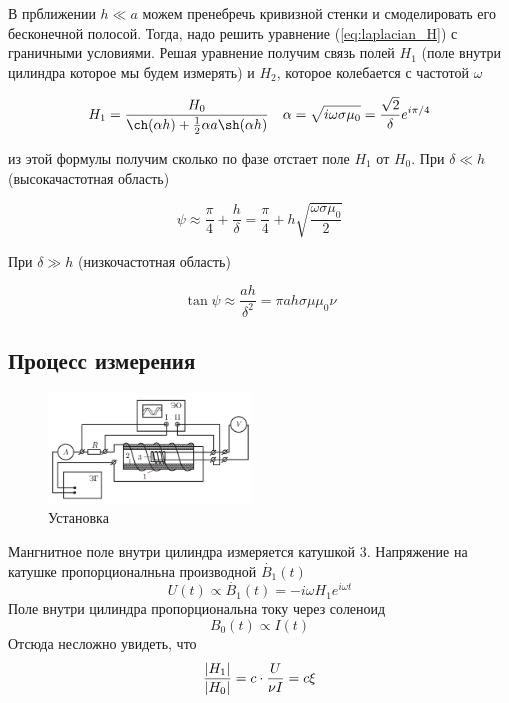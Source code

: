 \documentclass[a4paper]{article}
\begin{document}
В прближении $h \ll a$ можем пренебречь кривизной стенки и смоделировать
его бесконечной полосой. Тогда, надо решить уравнение (\ref{eq:laplacian_H})
с граничными условиями. Решая уравнение получим связь полей $H_1$
(поле внутри цилиндра которое мы будем измерять) и $H_2$, которое колебается с частотой
$\omega$

\begin{equation}
    H_1 = \frac{H_0}{\ch(\alpha h) + \frac{1}{2} \alpha a \sh(\alpha h)}
    \text{\ \ \ }
    \alpha = \sqrt{i\omega \sigma \mu_0} = \frac{\sqrt{2}}{\delta}e^{i\pi/4}
    \label{eq:svyaz_poley}
\end{equation}

из этой формулы получим сколько по фазе отстает поле $H_1$ от $H_0$. При $\delta \ll h$
(высокачастотная область)

\begin{equation}
    \psi \approx \frac{\pi}{4} + \frac{h}{\delta} =
    \frac{\pi}{4} + h \sqrt{\frac{\omega \sigma \mu_0}{2}}
    \label{eq:faza_high_freq}
\end{equation}

При $\delta \gg h$ (низкочастотная область)

\begin{equation}
    \tan \psi \approx \frac{ah}{\delta^2} = \pi a h \sigma \mu \mu_0 \nu
    \label{eq:faza_low_freq}
\end{equation}
\newpage

\subsection{Процесс измерения}
\begin{figure}
    \begin{center}
        \includegraphics[width=0.48\textwidth]{ustanovka}
    \end{center}
    \caption{Установка}\label{fig:ustanovka}
\end{figure}

Мангнитное поле внутри цилиндра измеряется катушкой 3. Напряжение на катушке
пропорционалньна производной $\dot{B_1}(t)$
\begin{equation*}
    U(t) \propto \dot{B_1}(t) = -i\omega H_1 e^{i\omega t}
\end{equation*}
Поле внутри цилиндра пропорциональна току через соленоид
\begin{equation*}
    B_0(t) \propto I(t)
\end{equation*}
Отсюда несложно увидеть, что
\begin{equation}
    \frac{\abs{H_1}}{\abs{H_0}} = c \cdot \frac{U}{\nu I} = c \xi
    \label{eq:otnoshenie_amplitud}
\end{equation}
\vspace{0.3cm}
\end{document}
